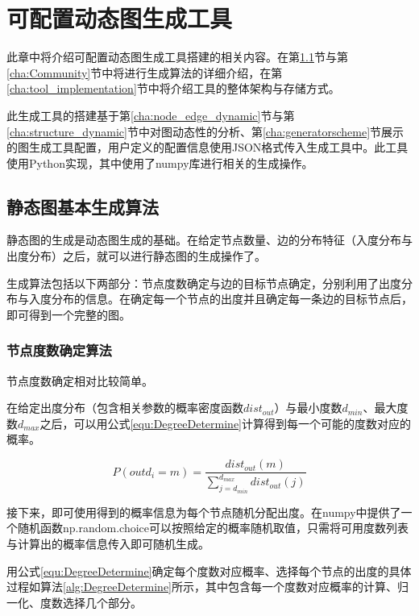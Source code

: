 
\chapter{可配置动态图生成工具}
\label{cha:chapter03}

此章中将介绍可配置动态图生成工具搭建的相关内容。在第\ref{cha:staticgraph}节与第\ref{cha:Community}节中将进行生成算法的详细介绍，在第\ref{cha:tool_implementation}节中将介绍工具的整体架构与存储方式。

此生成工具的搭建基于第\ref{cha:node_edge_dynamic}节与第\ref{cha:structure_dynamic}节中对图动态性的分析、第\ref{cha:generatorscheme}节展示的图生成工具配置，用户定义的配置信息使用JSON格式传入生成工具中。此工具使用Python实现，其中使用了numpy库进行相关的生成操作。

\section{静态图基本生成算法}
\label{cha:staticgraph}

静态图的生成是动态图生成的基础。在给定节点数量、边的分布特征（入度分布与出度分布）之后，就可以进行静态图的生成操作了。

生成算法包括以下两部分：节点度数确定与边的目标节点确定\cite{FastSGG}，分别利用了出度分布与入度分布的信息。在确定每一个节点的出度并且确定每一条边的目标节点后，即可得到一个完整的图。

\subsection{节点度数确定算法}

节点度数确定相对比较简单。

在给定出度分布（包含相关参数的概率密度函数$dist_{out}$）与最小度数$d_{min}$、最大度数$d_{max}$之后，可以用公式\ref{equ:DegreeDetermine}计算得到每一个可能的度数对应的概率。

\begin{equation}
  \label{equ:DegreeDetermine}
  P\left(outd_i=m\right)=\frac{dist_{out}(m)}{\sum\limits_{j=d_{min}}^{d_{max}}dist_{out}(j)}
\end{equation}

接下来，即可使用得到的概率信息为每个节点随机分配出度。在numpy中提供了一个随机函数np.random.choice可以按照给定的概率随机取值，只需将可用度数列表与计算出的概率信息传入即可随机生成。

用公式\ref{equ:DegreeDetermine}确定每个度数对应概率、选择每个节点的出度的具体过程如算法\ref{alg:DegreeDetermine}所示，其中包含每一个度数对应概率的计算、归一化、度数选择几个部分。

